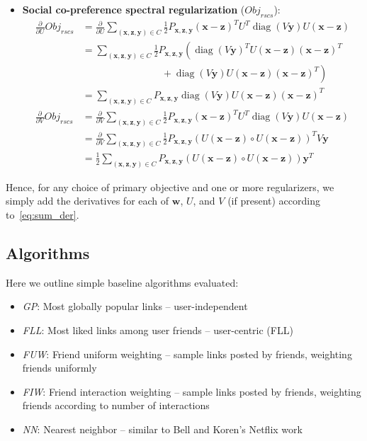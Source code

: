 \documentclass[11pt,a4paper]{article}
\newcommand{\Obj}{\mathit{Obj}}
\newcommand{\rscs}{\mathit{rscs}}
\newcommand{\diag}{\operatorname{diag}}
\newcommand{\x}{\vec{x}}
\newcommand{\y}{\vec{y}}
\newcommand{\z}{\vec{z}}
\newcommand{\w}{\vec{w}}
\renewcommand{\vec}[1]{\mathbf{#1}}
\begin{document}
\begin{itemize}
\item {\bf Social co-preference spectral regularization} ($\Obj_\rscs$):
\begin{align*}
\frac{\partial}{\partial U} \Obj_\rscs & = \frac{\partial}{\partial U} \sum_{(\x,\z,\y) \in C} \frac{1}{2} P_{\x,\z,\y} (\x - \z)^T U^T \diag(V\y) U (\x - \z)\\
& = \sum_{(\x,\z,\y) \in C} \frac{1}{2} P_{\x,\z,\y} \left( \diag(V\y)^T U (\x - \z) (\x - \z)^T \right.\\
& \left. \qquad \qquad \qquad \qquad + \diag(V\y) U (\x - \z) (\x - \z)^T \right)\\
& = \sum_{(\x,\z,\y) \in C} P_{\x,\z,\y} \diag(V\y) U (\x - \z) (\x - \z)^T\\
\frac{\partial}{\partial V} \Obj_\rscs & = \frac{\partial}{\partial V} \sum_{(\x,\z,\y) \in C} \frac{1}{2} P_{\x,\z,\y} (\x - \z)^T U^T \diag(V\y) U (\x - \z)\\
& = \frac{\partial}{\partial V} \sum_{(\x,\z,\y) \in C} \frac{1}{2} P_{\x,\z,\y} (U(\x-\z) \circ U(\x-\z))^T V\y\\
& = \frac{1}{2} \sum_{(\x,\z,\y) \in C} P_{\x,\z,\y} (U(\x-\z) \circ U(\x-\z)) \y^T
\end{align*}
\end{itemize}

Hence, for any choice of primary objective and one or more regularizers,
we simply add the derivatives for each of $\w$, $U$, and $V$ (if present) 
according to~\eqref{eq:sum_der}.

\subsection{Algorithms}

Here we outline simple baseline algorithms evaluated:
\begin{itemize}
\item {\it GP}: Most globally popular links -- user-independent
\item {\it FLL}: Most liked links among user friends -- user-centric (FLL) 
\item {\it FUW}: Friend uniform weighting -- sample links posted by friends, weighting friends uniformly
\item {\it FIW}: Friend interaction weighting -- sample links posted by friends, weighting friends according to number of interactions
\item {\it NN}: Nearest neighbor -- similar to Bell and Koren's Netflix work
\end{itemize}
\end{document}

